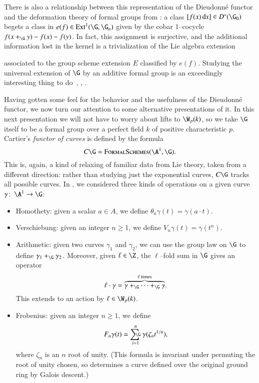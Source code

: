 \begin{remark}\label{ExtensionsPresentationOfDieudonne}
There is also a relationship between this representation of the Dieudonn\'e functor and the deformation theory of formal groups from : a class $[f(x)\dx] \in D^*(\G_0)$ begets a class in $e(f) \in \Ext^1(\G, \G_a)$ given by the cobar $1$--cocycle $f(x +_{\G} y) - f(x) - f(y)$.  In fact, this assignment is surjective, and the additional information lost in the kernel is a trivialization of the Lie algebra extension
\begin{center}
\end{center}
associated to the group scheme extension $E$ classified by $e(f)$.  Studying the universal extension of $\G$ by an additive formal group is an exceedingly interesting thing to do~\cite[Section V.4]{GrothendieckCristaux}, \cite{MazurMessing}, \cite[Section 11]{HopkinsGrossEquivVBs}.
\end{remark}

Having gotten some feel for the behavior and the usefulness of the Dieudonn\'e functor, we now turn our attention to some alternative presentations of it.  In this next presentation we will not have to worry about lifts to $\W_p(k)$, so we take $\G$ itself to be a formal group over a perfect field $k$ of positive characteristic $p$.  Cartier's \textit{functor of curves} is defined by the formula \[C\G = \CatOf{FormalSchemes}(\A^1, \G).\]  This is, again, a kind of relaxing of familiar data from Lie theory, taken from a different direction: rather than studying just the exponential curves, $C\G$ tracks all possible curves.  In , we considered three kinds of operations on a given curve $\gamma\co \A^1 \to \G$:
\begin{itemize}
\item {}Homothety: given a scalar $a \in A$, we define $\theta_a \gamma(t) = \gamma(a \cdot t)$.
\item {}Verschiebung: given an integer $n \ge 1$, we define $V_n \gamma(t) = \gamma(t^n)$.
\item {}Arithmetic: given two curves $\gamma_1$ and $\gamma_2$, we can use the group law on $\G$ to define $\gamma_1 +_{\G} \gamma_2$.  Moreover, given $\ell \in \Z$, the $\ell$--fold sum in $\G$ gives an operator \[\ell \cdot \gamma = \overset{\text{$\ell$ times}}{\overbrace{\gamma +_{\G} \cdots +_{\G} \gamma}}.\]  This extends to an action by $\ell \in \W_p(k)$.
\item {}Frobenius: given an integer $n \ge 1$, we define \[F_n \gamma(t) = \sumG_{i=1}^n \gamma(\zeta_n t^{1/n}),\] where $\zeta_{n}$ is an $n${\th} root of unity.  (This formula is invariant under permuting the root of unity chosen, so determines a curve defined over the original ground ring by Galois descent.)
\end{itemize}


